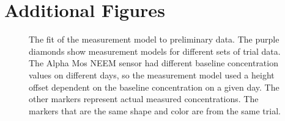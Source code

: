 \documentclass[submit, 12pt]{aiaa-pretty-modified}
\begin{document}
\section{Additional Figures}
\begin{figure}
\begin{center}
\caption[Fit of model parameters to preliminary data.]{
  The fit of the measurement model to preliminary data. The purple
  diamonds show measurement models for different sets of trial data. The Alpha
  Mos NEEM sensor had different baseline concentration values on different days,
  so the measurement model used a height offset dependent on the baseline
  concentration on a given day. The other markers represent actual measured
  concentrations. The markers that are the same shape and color are from the
  same trial.}
\end{center}
\end{figure}
\end{document}
